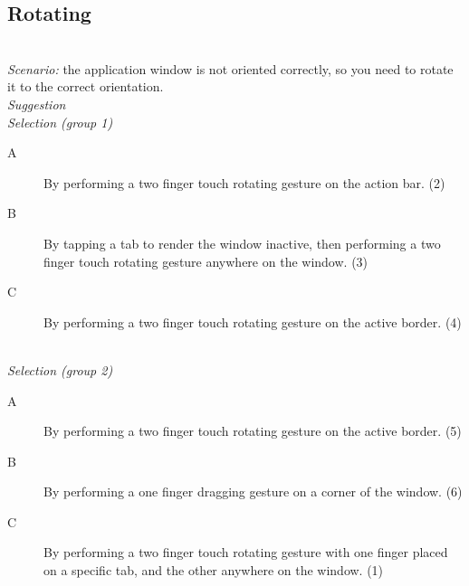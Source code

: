 \subsection{Rotating}
\hfill\\
\emph{Scenario:}
the application window is not oriented correctly, so you need to rotate it to the correct orientation. 
\hfill\\
\emph{Suggestion}
\hfill\\
\emph{Selection (group 1)}
\begin{description}
\item[A]{By performing a two finger touch rotating gesture on the action bar. (2)}
\item[B]{By tapping a tab to render the window inactive, then performing a two finger touch rotating gesture anywhere on the window. (3)}
\item[C]{By performing a two finger touch rotating gesture on the active border. (4)}
\end{description}
\hfill\\
\emph{Selection (group 2)}
\begin{description}
\item[A]{By performing a two finger touch rotating gesture on the active border. (5)}
\item[B]{By performing a one finger dragging gesture on a corner of the window. (6)}
\item[C]{By performing a two finger touch rotating gesture with one finger placed on a specific tab, and the other anywhere on the window. (1)}
\end{description}


